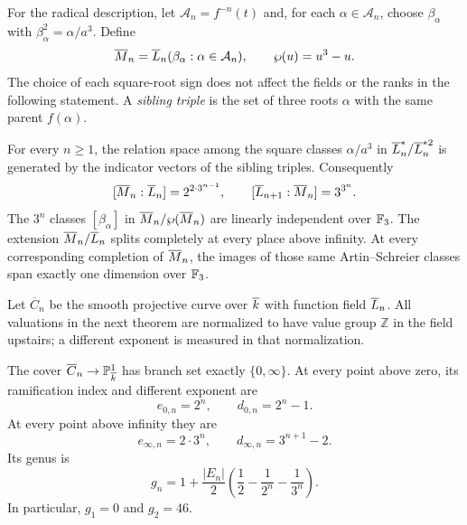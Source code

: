 For the radical description, let $\mathcal A_n=f^{-n}(t)$ and, for
each $\alpha\in\mathcal A_n$, choose
$\beta_\alpha$ with $\beta_\alpha^2=\alpha/a^3$. Define
\[
 \overline{M}_n=\overline{L}_n(\beta_\alpha:\alpha\in\mathcal A_n),
 \qquad \wp(u)=u^3-u.
\]
The choice of each square-root sign does not affect the fields or the
ranks in the following statement. A \emph{sibling triple} is the set
of three roots $\alpha$ with the same parent $f(\alpha)$.

\begin{theorem}\label{thm:ranks}
For every $n\geq1$, the relation space among the square classes
$\alpha/a^3$ in $\overline{L}_n^*/\overline{L}_n^{*2}$ is generated by the
indicator vectors of the sibling triples. Consequently
\begin{equation}\label{eq:radicaldegrees}
 [\overline{M}_n:\overline{L}_n]=2^{2\cdot3^{n-1}},\qquad
 [\overline{L}_{n+1}:\overline{M}_n]=3^{3^n}.
\end{equation}
The $3^n$ classes $[\beta_\alpha]$ in
$\overline{M}_n/\wp(\overline{M}_n)$ are linearly independent over $\mathbb{F}_3$.
The extension $\overline{M}_n/\overline{L}_n$ splits completely at every place
above infinity. At every corresponding completion of $\overline{M}_n$, the
images of those same Artin--Schreier classes span exactly one
dimension over $\mathbb{F}_3$.
\end{theorem}

Let $\overline C_n$ be the smooth projective curve over $\overline{k}$ with
function field $\overline{L}_n$. All valuations in the next theorem are
normalized to have value group $\mathbb Z$ in the field upstairs; a
different exponent is measured in that normalization.

\begin{theorem}\label{thm:genus}
The cover $\overline C_n\to\mathbb{P}^1_{\overline{k}}$ has branch set exactly
$\{0,\infty\}$. At every point above zero, its ramification index
and different exponent are
\begin{equation}\label{eq:zero-data}
 e_{0,n}=2^n,\qquad d_{0,n}=2^n-1.
\end{equation}
At every point above infinity they are
\begin{equation}\label{eq:infinity-data}
 e_{\infty,n}=2\cdot3^n,\qquad d_{\infty,n}=3^{n+1}-2.
\end{equation}
Its genus is
\begin{equation}\label{eq:genus}
 g_n=1+\frac{|E_n|}{2}
       \left(\frac12-\frac1{2^n}-\frac1{3^n}\right).
\end{equation}
In particular, $g_1=0$ and $g_2=46$.
\end{theorem}

